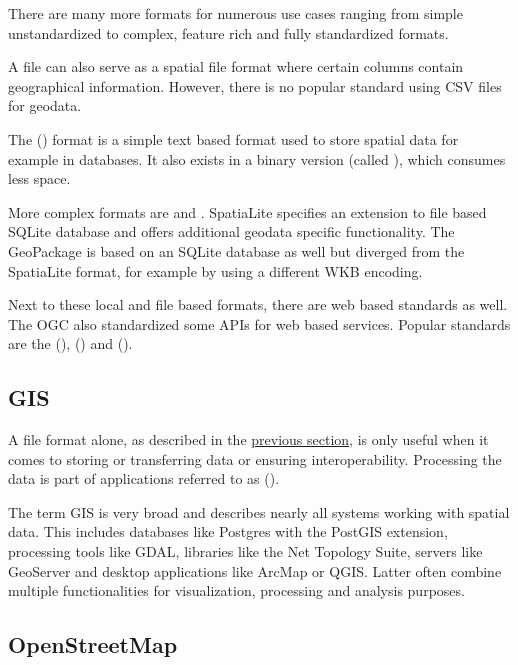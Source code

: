 		
			There are many more formats for numerous use cases ranging from simple unstandardized to complex, feature rich and fully standardized formats.
			
			A  file can also serve as a spatial file format where certain columns contain geographical information.
			However, there is no popular standard using CSV files for geodata.
			
			The  () format is a simple text based format used to store spatial data for example in databases.
			It also exists in a binary version (called ), which consumes less space.
			
			More complex formats are  and .
			SpatiaLite specifies an extension to file based SQLite database and offers additional geodata specific functionality\cite{spatialite-website}.
			The GeoPackage is based on an SQLite database as well but diverged from the SpatiaLite format, for example by using a different WKB encoding\cite{geopackage-faq}.
			
			Next to these local and file based formats, there are web based standards as well.
			The OGC also standardized some APIs for web based services.
			Popular standards are the  (),  () and  ().
	
	\subsection{GIS}
	
		A file format alone, as described in the \hyperref[subsec:file-formats]{previous section}, is only useful when it comes to storing or transferring data or ensuring interoperability.
		Processing the data is part of applications referred to as  ().
		
		The term GIS is very broad and describes nearly all systems working with spatial data.
		This includes databases like Postgres with the PostGIS extension, processing tools like GDAL, libraries like the Net Topology Suite, servers like GeoServer and desktop applications like ArcMap or QGIS.
		Latter often combine multiple functionalities for visualization, processing and analysis purposes.
	
	\subsection{OpenStreetMap}
	
